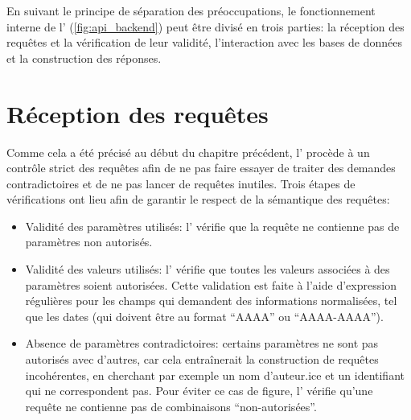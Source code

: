 En suivant le principe de séparation des préoccupations, le fonctionnement interne de l'\api{} (\ref{fig:api_backend}) peut être divisé en trois parties: la réception des requêtes et la vérification de leur validité, l'interaction avec les bases de données et la construction des réponses.

\section{Réception des requêtes}
Comme cela a été précisé au début du chapitre précédent, l'\api{} procède à un contrôle strict des requêtes afin de ne pas faire essayer de traiter des demandes contradictoires et de ne pas lancer de requêtes inutiles. Trois étapes de vérifications ont lieu afin de garantir le respect de la sémantique des requêtes:

\begin{itemize}
	\item Validité des paramètres utilisés: l'\api{} vérifie que la requête ne contienne pas de paramètres non autorisés.
	\item Validité des valeurs utilisés: l'\api{} vérifie que toutes les valeurs associées à des paramètres soient autorisées. Cette validation est faite à l'aide d'\glspl{expression régulière} pour les champs qui demandent des informations normalisées, tel que les dates (qui doivent être au format \enquote{AAAA} ou \enquote{AAAA-AAAA}).
	\item Absence de paramètres contradictoires: certains paramètres ne sont pas autorisés avec d'autres, car cela entraînerait la construction de requêtes incohérentes, en cherchant par exemple un nom d'auteur.ice et un identifiant qui ne correspondent pas. Pour éviter ce cas de figure, l'\api{} vérifie qu'une requête ne contienne pas de combinaisons \enquote{non-autorisées}.
\end{itemize}

